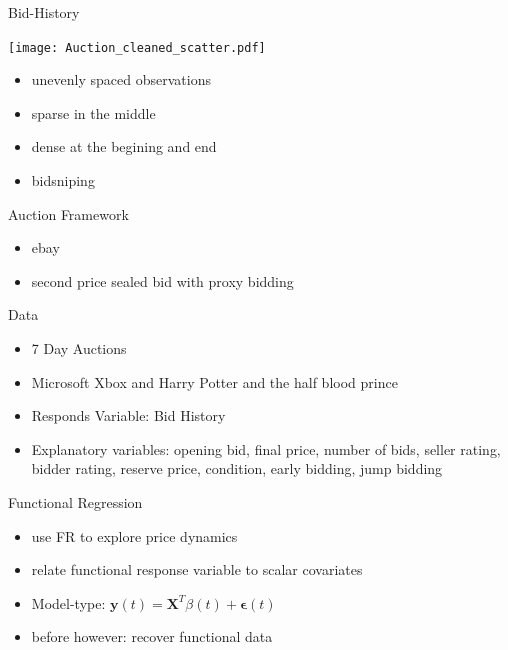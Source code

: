 \documentclass[hyperref={pdfpagelabels=false}]{beamer}
\begin{document}
\begin{frame}{Bid-History} %
\begin{minipage}[c]{0.65\textwidth}
\texttt{[image: Auction\_cleaned\_scatter.pdf]}
\end{minipage}
\hfill
\begin{minipage}[c]{0.3\textwidth}
\begin{itemize}
\item unevenly spaced observations
\item sparse in the middle
\item dense at the begining and end
\item bidsniping
\end{itemize}
\end{minipage}
\end{frame}

\begin{frame}{Auction Framework} %
\begin{itemize}
    \item ebay
    \item second price sealed bid with proxy bidding
\end{itemize}
Data
\begin{itemize}
    \item 7 Day Auctions
    \item Microsoft Xbox and Harry Potter and the half blood prince
    \item Responds Variable: Bid History
    \item Explanatory variables: opening bid, final price, number of bids, seller rating, bidder rating, reserve price, condition, early bidding, jump bidding
\end{itemize}
\end{frame}

\begin{frame}{Functional Regression}
\begin{itemize}
    \item use FR to explore price dynamics
    \item relate functional response variable to scalar covariates
    \item Model-type: $\mathbf{y}(t)=\mathbf{X}^T\beta(t)+\mathbf{\epsilon}(t)$ %
    \item before however: recover functional data
\end{itemize}
\end{frame}
\end{document}
